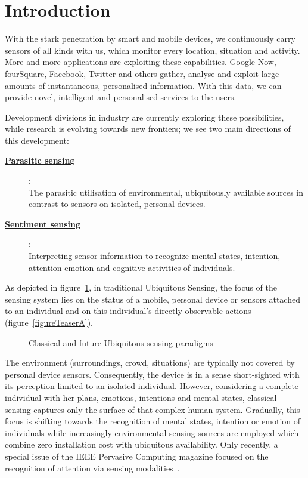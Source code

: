 \documentclass[journal]{IEEEtran}
\begin{document}
  

\IEEEpeerreviewmaketitle

\section{Introduction}
With the stark penetration by smart and mobile devices, we continuously carry sensors of all kinds with us, which monitor every location, situation and activity.
More and more applications are exploiting these capabilities. 
Google Now, fourSquare, Facebook, Twitter and others gather, analyse and exploit large amounts of instantaneous, personalised information.
With this data, we can provide novel, intelligent and personalised services to the users.

Development divisions in industry are currently exploring these possibilities, while research is evolving towards new frontiers; we see two main directions of this development:
\begin{description}
 \item[\textbf{\underline{Parasitic sensing}}]:\\ The parasitic utilisation of environmental, ubiquitously available sources in contrast to sensors on isolated, personal devices.
 \item[\textbf{\underline{Sentiment sensing}}]:\\ Interpreting sensor information to recognize mental states, intention, attention emotion and cognitive activities of individuals.
\end{description}
As depicted in figure~\ref{figureTeaser}, in traditional Ubiquitous Sensing, the focus of the sensing system lies on the status of a mobile, personal device or sensors attached to an individual and on this individual's directly observable actions (figure~\ref{figureTeaserA}).
\begin{figure}

\caption{Classical and future Ubiquitous sensing paradigms}
\label{figureTeaser}
\end{figure}
The environment (surroundings, crowd, situations) are typically not covered by personal device sensors.
Consequently, the device is in a sense short-sighted with its perception limited to an isolated individual. 
However, considering a complete individual with her plans, emotions, intentions and mental states, classical sensing captures only the surface of that complex human system. 
Gradually, this focus is shifting towards the recognition of mental states, intention or emotion of individuals while increasingly environmental sensing sources are employed which combine zero installation cost with ubiquitous availability.
Only recently, a special issue of the IEEE Pervasive Computing magazine focused on the recognition of attention via sensing modalities~\cite{Pervasive_Ferscha_2014}.
\end{document}
